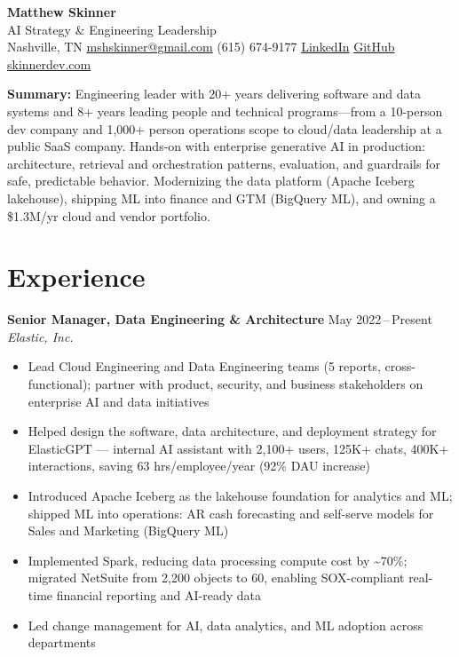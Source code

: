 \documentclass[letterpaper,18pt]{extarticle}
\begin{document}
\begin{center}
  {\LARGE\bfseries Matthew Skinner} \\[4pt]
  {\normalsize AI Strategy \& Engineering Leadership} \\[3pt]
  Nashville, TN \quad
  \href{mailto:mshskinner@gmail.com}{mshskinner@gmail.com} \quad
  (615) 674-9177 \quad
  \href{https://www.linkedin.com/in/skinner1985/}{LinkedIn} \quad
  \href{https://github.com/lord-skinner}{GitHub} \quad
  \href{https://www.skinnerdev.com}{skinnerdev.com}
\end{center}

\vspace{4pt}
\begin{minipage}{\textwidth}
\small
\textbf{Summary:} Engineering leader with 20+ years delivering software and data systems and 8+ years leading people and technical programs---from a 10-person dev company and 1,000+ person operations scope to cloud/data leadership at a public SaaS company. Hands-on with enterprise generative AI in production: architecture, retrieval and orchestration patterns, evaluation, and guardrails for safe, predictable behavior. Modernizing the data platform (Apache Iceberg lakehouse), shipping ML into finance and GTM (BigQuery ML), and owning a \$1.3M/yr cloud and vendor portfolio.
\end{minipage}
\vspace{8pt}

\section{Experience}

\textbf{Senior Manager, Data Engineering \& Architecture} \hfill May 2022\,--\,Present \\
\textit{Elastic, Inc.}
\begin{itemize}
  \item Lead Cloud Engineering and Data Engineering teams (5 reports, cross-functional); partner with product, security, and business stakeholders on enterprise AI and data initiatives
  \item Helped design the software, data architecture, and deployment strategy for ElasticGPT --- internal AI assistant with 2,100+ users, 125K+ chats, 400K+ interactions, saving 63 hrs/employee/year (92\% DAU increase)
  \item Introduced Apache Iceberg as the lakehouse foundation for analytics and ML; shipped ML into operations: AR cash forecasting and self-serve models for Sales and Marketing (BigQuery ML)
  \item Implemented Spark, reducing data processing compute cost by \textasciitilde70\%; migrated NetSuite from 2,200 objects to 60, enabling SOX-compliant real-time financial reporting and AI-ready data
  \item Led change management for AI, data analytics, and ML adoption across departments
\end{itemize}
\end{document}

